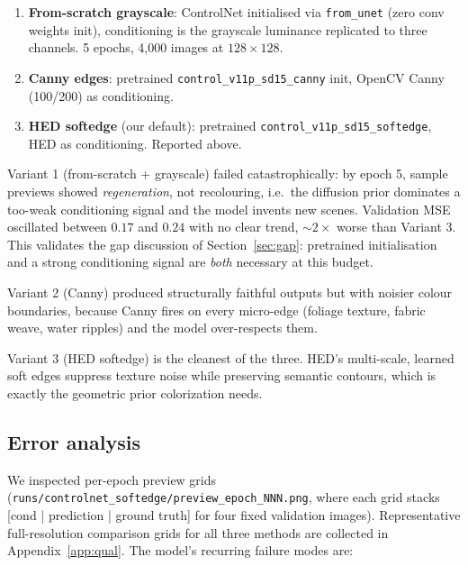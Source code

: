 \documentclass[conference]{IEEEtran}
\begin{document}
\begin{enumerate}
  \item \textbf{From-scratch grayscale}: ControlNet initialised via
        \texttt{from\_unet} (zero conv weights init), conditioning is
        the grayscale luminance replicated to three channels. 5 epochs,
        4{,}000 images at $128\times128$.
  \item \textbf{Canny edges}: pretrained
        \texttt{control\_v11p\_sd15\_canny} init, OpenCV Canny
        (100/200) as conditioning.
  \item \textbf{HED softedge} (our default): pretrained
        \texttt{control\_v11p\_sd15\_softedge}, HED as conditioning.
        Reported above.
\end{enumerate}

Variant 1 (from-scratch + grayscale) failed catastrophically: by
epoch 5, sample previews showed \emph{regeneration}, not recolouring,
i.e.\ the diffusion prior dominates a too-weak conditioning signal and
the model invents new scenes. Validation MSE oscillated between
$0.17$ and $0.24$ with no clear trend, $\sim$$2{\times}$ worse than
Variant 3. This validates the gap discussion of
Section~\ref{sec:gap}: pretrained initialisation and a strong
conditioning signal are \emph{both} necessary at this budget.

Variant 2 (Canny) produced structurally faithful outputs but with
noisier colour boundaries, because Canny fires on every micro-edge
(foliage texture, fabric weave, water ripples) and the model
over-respects them.

Variant 3 (HED softedge) is the cleanest of the three. HED's
multi-scale, learned soft edges suppress texture noise while
preserving semantic contours, which is exactly the geometric prior
colorization needs.

\subsection{Error analysis}
We inspected per-epoch preview grids
(\texttt{runs/controlnet\_softedge/preview\_epoch\_NNN.png}, where
each grid stacks [cond | prediction | ground truth] for four fixed
validation images). Representative full-resolution comparison grids for
all three methods are collected in Appendix~\ref{app:qual}. The model's
recurring failure modes are:
\end{document}
